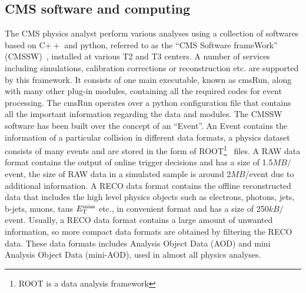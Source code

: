 \subsection{CMS software and computing}
The CMS physics analyst perform various analyses using a collection of softwares based on C$++$ and python, referred to as the ``CMS Software frameWork''
(CMSSW)~\cite{cmsTDR}, installed at various T2 and T3 centers.
A number of services including simulations, calibration corrections or reconstruction etc. are supported by this framework.  
It consists of one main executable, known as cmsRun, along with many other plug-in modules, containing all the required codes for event processing.  
The cmsRun operates over a python configuration file that contains all the important information regarding the data and modules. 
The CMSSW software has been built over the concept of an ``Event''. An Event contains the information of a particular collision in different data
formats, a physics dataset consists of many events and are stored in the form of ROOT\footnote{ROOT is a data analysis framework}~\cite{Brun:1997pa} files.
A RAW data format contains the output of online trigger decisions and has a size of 1.5$\unit{MB}/$event, the size of RAW data in a simulated sample
is around 2$\unit{MB}/$event due to additional information. A RECO data
format contains the offline reconstructed data that includes the high level physics objects such as electrons, photons, jets, b-jets, muons, taus $E_{\mathrm{T}}^{\text{miss}}$ etc., in
convenient format and has a size of 250$\unit{kB}/$event. Usually, a RECO data format contains a large amount of unwanted information,
so more compact data formats are obtained by filtering the RECO data. These data formats
includes Analysis Object Data (AOD) and mini Analysis Object Data (mini-AOD), used in almost all physics analyses. 

%


